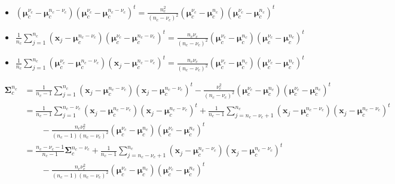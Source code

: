 \documentclass[a4paper,11pt,DIV=16]{scrartcl}
\begin{document}
        \begin{itemize}
            \item $(\boldsymbol{\mu}_c^{\nu_c}-\boldsymbol{\mu}_c^{n_c-\nu_c})(\boldsymbol{\mu}_c^{\nu_c}-\boldsymbol{\mu}_c^{n_c-\nu_c})^t = \frac{n_c^2}{(n_c-\nu_c)^2} (\boldsymbol{\mu}_c^{\nu_c}-\boldsymbol{\mu}_c^{n_c})(\boldsymbol{\mu}_c^{\nu_c}-\boldsymbol{\mu}_c^{n_c})^t$
            \item $\frac{1}{n_c} \sum_{j = 1}^{n_c} (\mathbf{x}_j-\boldsymbol{\mu}_c^{n_c-\nu_c})(\boldsymbol{\mu}_c^{\nu_c}-\boldsymbol{\mu}_c^{n_c-\nu_c})^t = \frac{n_c \nu_c}{(n_c-\nu_c)^2} (\boldsymbol{\mu}_c^{\nu_c}-\boldsymbol{\mu}_c^{n_c})(\boldsymbol{\mu}_c^{\nu_c}-\boldsymbol{\mu}_c^{n_c})^t$
            \item $\frac{1}{n_c} \sum_{j = 1}^{n_c} (\boldsymbol{\mu}_c^{\nu_c}-\boldsymbol{\mu}_c^{n_c-\nu_c})(\mathbf{x}_j-\boldsymbol{\mu}_c^{n_c-\nu_c})^t = \frac{n_c \nu_c}{(n_c-\nu_c)^2} (\boldsymbol{\mu}_c^{\nu_c}-\boldsymbol{\mu}_c^{n_c})(\boldsymbol{\mu}_c^{\nu_c}-\boldsymbol{\mu}_c^{n_c})^t$
        \end{itemize}

        \begin{align*}
            \boldsymbol{\Sigma}_c^{n_c} &= \frac{1}{n_c - 1} \sum_{j = 1}^{n_c} (\mathbf{x}_j - \boldsymbol{\mu}_c^{n_c-\nu_c}) (\mathbf{x}_j - \boldsymbol{\mu}_c^{n_c-\nu_c})^t - \frac{\nu_c^2}{(n_c-\nu_c)^2} (\boldsymbol{\mu}_c^{\nu_c}-\boldsymbol{\mu}_c^{n_c})(\boldsymbol{\mu}_c^{\nu_c}-\boldsymbol{\mu}_c^{n_c})^t \\
                           &= \frac{1}{n_c - 1} \sum_{j = 1}^{n_c-\nu_c} (\mathbf{x}_j - \boldsymbol{\mu}_c^{n_c-\nu_c}) (\mathbf{x}_j - \boldsymbol{\mu}_c^{n_c-\nu_c})^t + \frac{1}{n_c - 1} \sum_{j = n_c-\nu_c+1}^{n_c} (\mathbf{x}_j - \boldsymbol{\mu}_c^{n_c-\nu_c}) (\mathbf{x}_j - \boldsymbol{\mu}_c^{n_c-\nu_c})^t \\
                           &\qquad - \frac{n_c \nu_c^2}{(n_c-1)(n_c-\nu_c)^2} (\boldsymbol{\mu}_c^{\nu_c}-\boldsymbol{\mu}_c^{n_c})(\boldsymbol{\mu}_c^{\nu_c}-\boldsymbol{\mu}_c^{n_c})^t \\
                           &= \frac{n_c-\nu_c-1}{n_c-1} \boldsymbol{\Sigma}_c^{n_c-\nu_c} + \frac{1}{n_c - 1} \sum_{j = n_c-\nu_c+1}^{n_c} (\mathbf{x}_j - \boldsymbol{\mu}_c^{n_c-\nu_c}) (\mathbf{x}_j - \boldsymbol{\mu}_c^{n_c-\nu_c})^t \\
                           &\qquad - \frac{n_c \nu_c^2}{(n_c-1)(n_c-\nu_c)^2} (\boldsymbol{\mu}_c^{\nu_c}-\boldsymbol{\mu}_c^{n_c})(\boldsymbol{\mu}_c^{\nu_c}-\boldsymbol{\mu}_c^{n_c})^t \\
        \end{align*}
\end{document}

